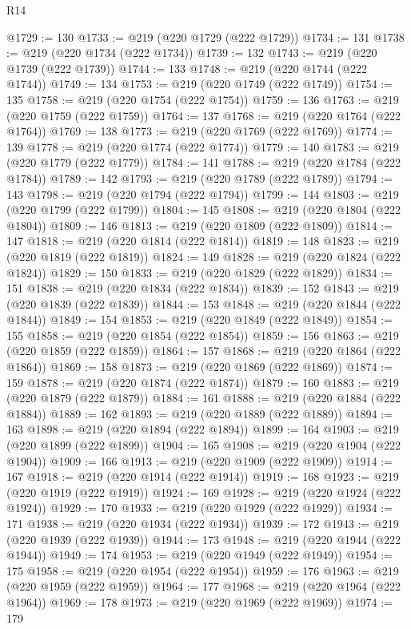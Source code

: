 \begin{lexlean}{R14}
\begin{coremodule}
@1729 := 130
@1733 := @219 (@220 @1729 (@222 @1729))
@1734 := 131
@1738 := @219 (@220 @1734 (@222 @1734))
@1739 := 132
@1743 := @219 (@220 @1739 (@222 @1739))
@1744 := 133
@1748 := @219 (@220 @1744 (@222 @1744))
@1749 := 134
@1753 := @219 (@220 @1749 (@222 @1749))
@1754 := 135
@1758 := @219 (@220 @1754 (@222 @1754))
@1759 := 136
@1763 := @219 (@220 @1759 (@222 @1759))
@1764 := 137
@1768 := @219 (@220 @1764 (@222 @1764))
@1769 := 138
@1773 := @219 (@220 @1769 (@222 @1769))
@1774 := 139
@1778 := @219 (@220 @1774 (@222 @1774))
@1779 := 140
@1783 := @219 (@220 @1779 (@222 @1779))
@1784 := 141
@1788 := @219 (@220 @1784 (@222 @1784))
@1789 := 142
@1793 := @219 (@220 @1789 (@222 @1789))
@1794 := 143
@1798 := @219 (@220 @1794 (@222 @1794))
@1799 := 144
@1803 := @219 (@220 @1799 (@222 @1799))
@1804 := 145
@1808 := @219 (@220 @1804 (@222 @1804))
@1809 := 146
@1813 := @219 (@220 @1809 (@222 @1809))
@1814 := 147
@1818 := @219 (@220 @1814 (@222 @1814))
@1819 := 148
@1823 := @219 (@220 @1819 (@222 @1819))
@1824 := 149
@1828 := @219 (@220 @1824 (@222 @1824))
@1829 := 150
@1833 := @219 (@220 @1829 (@222 @1829))
@1834 := 151
@1838 := @219 (@220 @1834 (@222 @1834))
@1839 := 152
@1843 := @219 (@220 @1839 (@222 @1839))
@1844 := 153
@1848 := @219 (@220 @1844 (@222 @1844))
@1849 := 154
@1853 := @219 (@220 @1849 (@222 @1849))
@1854 := 155
@1858 := @219 (@220 @1854 (@222 @1854))
@1859 := 156
@1863 := @219 (@220 @1859 (@222 @1859))
@1864 := 157
@1868 := @219 (@220 @1864 (@222 @1864))
@1869 := 158
@1873 := @219 (@220 @1869 (@222 @1869))
@1874 := 159
@1878 := @219 (@220 @1874 (@222 @1874))
@1879 := 160
@1883 := @219 (@220 @1879 (@222 @1879))
@1884 := 161
@1888 := @219 (@220 @1884 (@222 @1884))
@1889 := 162
@1893 := @219 (@220 @1889 (@222 @1889))
@1894 := 163
@1898 := @219 (@220 @1894 (@222 @1894))
@1899 := 164
@1903 := @219 (@220 @1899 (@222 @1899))
@1904 := 165
@1908 := @219 (@220 @1904 (@222 @1904))
@1909 := 166
@1913 := @219 (@220 @1909 (@222 @1909))
@1914 := 167
@1918 := @219 (@220 @1914 (@222 @1914))
@1919 := 168
@1923 := @219 (@220 @1919 (@222 @1919))
@1924 := 169
@1928 := @219 (@220 @1924 (@222 @1924))
@1929 := 170
@1933 := @219 (@220 @1929 (@222 @1929))
@1934 := 171
@1938 := @219 (@220 @1934 (@222 @1934))
@1939 := 172
@1943 := @219 (@220 @1939 (@222 @1939))
@1944 := 173
@1948 := @219 (@220 @1944 (@222 @1944))
@1949 := 174
@1953 := @219 (@220 @1949 (@222 @1949))
@1954 := 175
@1958 := @219 (@220 @1954 (@222 @1954))
@1959 := 176
@1963 := @219 (@220 @1959 (@222 @1959))
@1964 := 177
@1968 := @219 (@220 @1964 (@222 @1964))
@1969 := 178
@1973 := @219 (@220 @1969 (@222 @1969))
@1974 := 179

\end{coremodule}
\end{lexlean}
